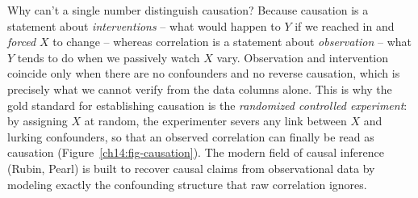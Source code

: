 \begin{happeningbox}
Why can't a single number distinguish causation? Because causation is a statement
about \emph{interventions} -- what would happen to $Y$ if we reached in and
\emph{forced} $X$ to change -- whereas correlation is a statement about
\emph{observation} -- what $Y$ tends to do when we passively watch $X$ vary.
Observation and intervention coincide only when there are no confounders and no
reverse causation, which is precisely what we cannot verify from the data columns
alone. This is why the gold standard for establishing causation is the
\emph{randomized controlled experiment}: by assigning $X$ at random, the
experimenter severs any link between $X$ and lurking confounders, so that an
observed correlation can finally be read as causation (Figure~\ref{ch14:fig-causation}). The modern field of causal
inference (Rubin, Pearl) is built to recover causal claims from observational data
by modeling exactly the confounding structure that raw correlation ignores.
\end{happeningbox}

